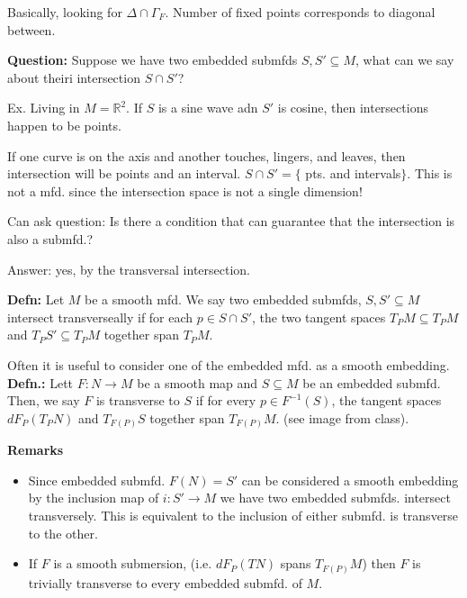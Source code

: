 \documentclass[12pt,letterpaper]{article}
\begin{document}
Basically, looking for $\Delta \cap \Gamma_F$. Number of fixed points corresponds to diagonal between.

\textbf{Question:} Suppose we have two embedded submfds $S, S' \subseteq M$, what can we say about theiri intersection $S\cap S'$? 

Ex. Living in $M= \mathbb{R}^2$. If $S$ is a sine wave adn $S'$ is cosine, then intersections happen to be points. 

If one curve is on the axis and another touches, lingers, and leaves, then intersection will be points and an interval. $S \cap S' = \{$ pts. and intervals$\}$. This is not a mfd. since the intersection space is not a single dimension!

Can ask question: Is there a condition that can guarantee that the intersection is also a submfd.? 

Answer: yes, by the transversal intersection. 

\textbf{Defn:} Let $M$ be a smooth mfd. We say two embedded submfds, $S, S' \subseteq M$ intersect transverseally if for each $p \in S \cap S'$, the two tangent spaces $T_P M \subseteq T_P M$ and $T_P S' \subseteq T_P M$ together span $T_P M$. 

Often it is useful to consider one of the embedded mfd. as a smooth embedding. \textbf{Defn.:} Lett $F: N \rightarrow M$ be a smooth map and $S \subseteq M$ be an embedded submfd. Then, we say $F$ is transverse to $S$ if for every $p \in F^{-1}(S)$, the tangent spaces $dF_P(T_P N)$ and $T_{F(P)} S$ together span $T_{F(P)} M$. (see image from class).

\textbf{Remarks}
\begin{itemize}
    \item Since embedded submfd. $F(N) = S'$ can be considered a smooth embedding by the inclusion map of $i: S' \rightarrow M$ we  have two embedded submfds. intersect transversely. This is equivalent to the inclusion of either submfd. is transverse to the other. 
    \item If $F$ is a smooth submersion, (i.e. $dF_P(TN)$ spans $T_{F(P)}M$) then $F$ is trivially transverse to every embedded submfd. of $M$. 
\end{itemize}
\end{document}

